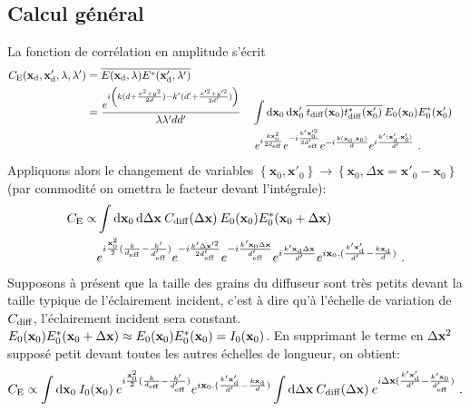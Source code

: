 \subsection{Calcul général}
La fonction de corrélation en amplitude s'écrit
\begin{align}
C_{\mathrm{E}}(\mathbf{x}_{\mathrm{d}},\mathbf{x}_{\mathrm{d}}',\lambda,\lambda')&=\overline{E(\mathbf{x}_{\mathrm{d}},\lambda) E^*(\mathbf{x}_{\mathrm{d}}',\lambda')} \\
\nonumber &=\frac{e^{i \left( k (d+ \frac{x^2+y^2}{2d})-k'(d'+\frac{x'^2+y'^2}{2d'}) \right)}}{\lambda \lambda' d d'} 
&& \int{ \mathop{}\mathopen{}\mathrm{d}\mathbf{x}_0\mathop{}\mathopen{}\mathrm{d}\mathbf{x}_0' \: \overline{t_{\mathrm{diff}}(\mathbf{x}_0) t_{\mathrm{diff}}^*(\mathbf{x}_0')} \: E_0(\mathbf{x}_0) E_0^*(\mathbf{x}_0')} \\ 
& && \; e^{i\frac{k \mathbf{x}_0^2}{2d_{\mathrm{eff}}}} e^{-i\frac{k' \mathbf{x}_0'^2}{2d_{\mathrm{eff}}'}} e^{-i\frac{k(\mathbf{x}_{\mathrm{d}}.\mathbf{x}_0)}{d}} e^{i\frac{k'(\mathbf{x}_{\mathrm{d}}'.\mathbf{x}_0')}{d'}} \text{ .}
\end{align}
Appliquons alors le changement de variables $\left\lbrace \mathbf{x}_0, \mathbf{x}'_0\right\rbrace \rightarrow \left\lbrace \mathbf{x}_0, \Delta\mathbf{x}= \mathbf{x}'_0-\mathbf{x}_0\right\rbrace$ (par commodité on omettra le facteur devant l'intégrale):
\begin{align}
  C_{\mathrm{E}} \propto &\int{\mathop{}\mathopen{}\mathrm{d}\mathbf{x}_0\mathop{}\mathopen{}\mathrm{d}\Delta\mathbf{x}\: C_{\mathrm{diff}}(\Delta\mathbf{x}) \: E_0(\mathbf{x}_0)E_0^*(\mathbf{x}_0+\Delta\mathbf{x})} \\ 
  \nonumber & e^{i \frac{\mathbf{x}_0^2}{2}(\frac{k}{d_{\mathrm{eff}}}-\frac{k'}{d_{\mathrm{eff}}'})} e^{-i\frac{k'\Delta\mathbf{x}'^2}{2d_{\mathrm{eff}}'}} e^{-i\frac{k'\mathbf{x}_0 \Delta\mathbf{x}}{d_{\mathrm{eff}}'}} e^{i\frac{k'\mathbf{x}_{\mathrm{d}} \Delta\mathbf{x}}{d'}} e^{i \mathbf{x}_0.(\frac{k'\mathbf{x}_{\mathrm{d}}'}{d'}-\frac{k\mathbf{x}_{\mathrm{d}}}{d})} \text{ .}
\end{align}
Supposons à présent que la taille des grains du diffuseur sont très petits devant la taille typique de l'éclairement incident, c'est à dire qu'à l'échelle de variation de $C_{\mathrm{diff}}$, l'éclairement incident sera constant. $E_0(\mathbf{x}_0)E_0^*(\mathbf{x}_0+\Delta\mathbf{x}) \approx E_0(\mathbf{x}_0)E_0^*(\mathbf{x}_0)=I_0(\mathbf{x}_0)$. En supprimant le terme en $\Delta\mathbf{x}^2$ supposé petit devant toutes les autres échelles de longueur, on obtient: 
\begin{equation}
C_{\mathrm{E}} \propto \int{\mathop{}\mathopen{}\mathrm{d}\mathbf{x}_0\: I_0(\mathbf{x}_0) \: e^{i \frac{\mathbf{x}_0^2}{2}(\frac{k}{d_{\mathrm{eff}}}-\frac{k'}{d_{\mathrm{eff}}'})} e^{i \mathbf{x}_0.(\frac{k'\mathbf{x}_{\mathrm{d}}'}{d'}-\frac{k\mathbf{x}_{\mathrm{d}}}{d})} \int{\mathop{}\mathopen{}\mathrm{d}\Delta\mathbf{x}\: C_{\mathrm{diff}}(\Delta\mathbf{x}) \: e^{i \Delta\mathbf{x}(\frac{k'\mathbf{x}_{\mathrm{d}}'}{d'}-\frac{k'\mathbf{x}_0}{d_{\mathrm{eff}}'})}}} \text{ .}
\end{equation}


